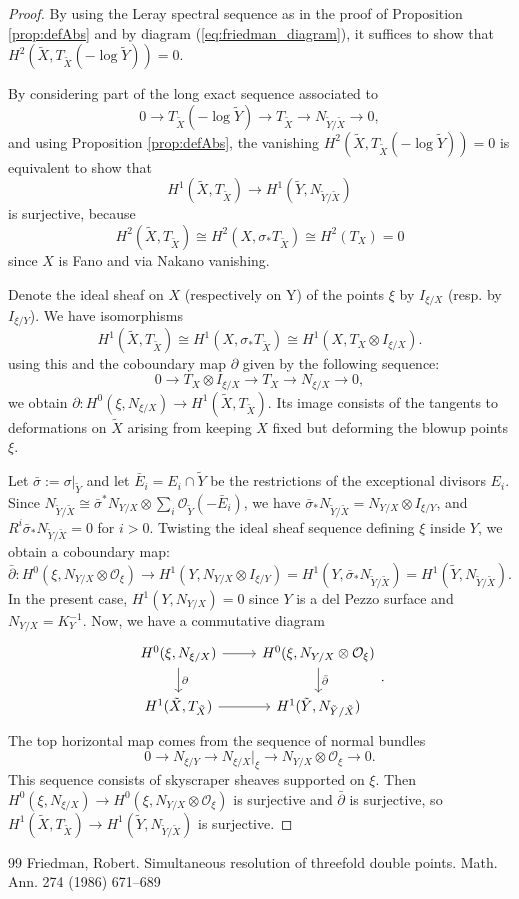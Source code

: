 \documentclass[10pt,a4paper]{amsart}
\newcommand{\OO}{\mathcal{O}}
\begin{document}
\begin{proof}
By using the Leray spectral sequence as in the proof of Proposition \ref{prop:defAbs} and by diagram (\ref{eq:friedman_diagram}), it suffices to show that $H^2(\tilde{X}, T_{\tilde X}(-\log \tilde Y))=0.$

By considering part of the long exact sequence associated to
$$0\to T_{\tilde X}(-\log \tilde Y)\to T_{\tilde X}\to N_{\tilde Y/ \tilde X}\to 0,$$
and using Proposition \ref{prop:defAbs}, the vanishing $H^2(\tilde{X}, T_{\tilde X}(-\log \tilde Y))=0$ is equivalent to show that 
$$H^1(\tilde X, T_{\tilde X})\to H^1(\tilde Y, N_{\tilde Y/ \tilde X}) $$
is surjective, because $$H^2(\tilde X, T_{\tilde X})\cong H^2(X, \sigma_* T_{\tilde X})\cong H^2(T_X)=0$$
since $X$ is Fano and via Nakano vanishing. 

Denote the ideal sheaf on $X$ (respectively on Y) of the points $\xi$ by $I_{\xi/X}$ (resp. by $I_{\xi/Y}$).
We have isomorphisms
$$H^1(\tilde X, T_{\tilde X})\cong H^1(X, \sigma_* T_{\tilde X})\cong H^1(X, T_X\otimes I_{\xi/X}). $$
using this and the coboundary map $\partial$ given by the following sequence:
$$0\to T_X\otimes I_{\xi/X}\to T_X\to N_{\xi/X}\to 0, $$
we obtain $\partial: H^0(\xi, N_{\xi/X})\to H^1(\tilde X, T_{\tilde X})$. Its image consists of the tangents to deformations on $\tilde X$ arising from keeping $X$ fixed but deforming the blowup points $\xi$.

Let $\bar{\sigma}:=\sigma\vert_{\tilde Y}$ and let $\bar{E}_i =E_i\cap \tilde{Y}$ be the restrictions of the exceptional divisors $E_i$.
Since $N_{\tilde Y/\tilde X}\cong \bar{\sigma}^* N_{Y/X}\otimes \sum_i \OO_{\tilde Y}(-\bar E_i)$, we have $\bar{\sigma}_* N_{\tilde{Y}/\tilde{X}}=N_{Y/X}\otimes I_{\xi/Y}$, and $R^i \bar{\sigma}_* N_{\tilde Y/\tilde X}=0$ for $i>0$.
Twisting the ideal sheaf sequence defining $\xi$ inside $Y$, we obtain a coboundary map:
$$\bar{\partial}:H^0(\xi, N_{Y/X}\otimes \OO_{\xi})\to H^1(Y, N_{Y/X}\otimes I_{\xi/Y})=H^1(Y, \bar{\sigma}_* N_{\tilde Y/\tilde X})=H^1(\tilde Y, N_{\tilde Y/ \tilde X}). $$
In the present case, $H^1(Y, N_{Y/X})=0$ since $Y$ is a del Pezzo surface and $N_{Y/X}=K_{Y}^{-1}$.
Now, we have a commutative diagram 
$$\begin{tikzcd}
  H^0(\xi,N_{\xi/X}) \ar[r] \ar[d, "\partial"] & H^0(\xi, N_{Y/X}\otimes \OO_\xi) \ar[d, "\bar{\partial} "] \\
  H^1(\tilde X, T_{\tilde X}) \ar[r] & H^1(\tilde Y, N_{\tilde Y/\tilde X})
\end{tikzcd}. $$
The top horizontal map comes from the sequence of normal bundles 
$$0\to N_{\xi/Y}\to N_{\xi/X}\vert_{\xi} \to N_{Y/X}\otimes \OO_{\xi}\to 0.$$ 
This sequence consists of skyscraper sheaves supported on $\xi$. Then $H^0(\xi, N_{\xi/X})\to H^0(\xi, N_{Y/X}\otimes \OO_{\xi})$ is surjective and $\bar{\partial}$ is surjective, so $H^1(\tilde X, T_{\tilde X})\to H^1(\tilde Y, N_{\tilde Y/\tilde X})$ is surjective.
\end{proof}


\begin{thebibliography}{99}
 Friedman, Robert. Simultaneous resolution of threefold double points. Math. Ann. 274 (1986) 671--689
\end{thebibliography}
\end{document}
